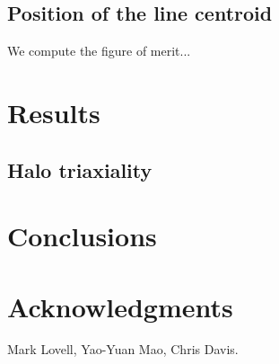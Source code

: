\documentclass[aps,prl,10pt,twocolumn,superscriptaddress,showpacs]{revtex4-1}
\begin{document}

\subsection{Position of the line centroid}

We compute the figure of merit... 


\section{Results}
\label{sec:results}






\subsection{Halo triaxiality}
\label{sec:triaxiality}




\section{Conclusions}
\label{sec:conclusions}

 
\vspace{-0.5 cm}
	

\section*{Acknowledgments} 

Mark Lovell, Yao-Yuan Mao, Chris Davis.


\newcommand{\mnras}[0]{M.N.R.A.S.}

%	
	
\end{document}
